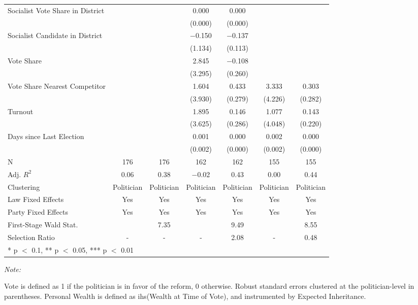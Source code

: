 \begin{table}[!h]
{\begin{threeparttable}
\begin{tabular}[t]{lcccccc}
Socialist Vote Share in District &  &  & \num{0.000} & \num{0.000} &  & \\
 &  &  & (\num{0.000}) & (\num{0.000}) &  & \\
Socialist Candidate in District &  &  & \num{-0.150} & \num{-0.137} &  & \\
 &  &  & (\num{1.134}) & (\num{0.113}) &  & \\
Vote Share &  &  & \num{2.845} & \num{-0.108} &  & \\
 &  &  & (\num{3.295}) & (\num{0.260}) &  & \\
Vote Share Nearest Competitor &  &  & \num{1.604} & \num{0.433} & \num{3.333} & \num{0.303}\\
 &  &  & (\num{3.930}) & (\num{0.279}) & (\num{4.226}) & (\num{0.282})\\
Turnout &  &  & \num{1.895} & \num{0.146} & \num{1.077} & \num{0.143}\\
 &  &  & (\num{3.625}) & (\num{0.286}) & (\num{4.048}) & (\num{0.220})\\
Days since Last Election &  &  & \num{0.001} & \num{0.000} & \num{0.002} & \num{0.000}\\
 &  &  & (\num{0.002}) & (\num{0.000}) & (\num{0.002}) & (\num{0.000})\\
\midrule
N & \num{176} & \num{176} & \num{162} & \num{162} & \num{155} & \num{155}\\
Adj. $R^2$ & \num{0.06} & \num{0.38} & \num{-0.02} & \num{0.43} & \num{0.00} & \num{0.44}\\
Clustering & Politician & Politician & Politician & Politician & Politician & Politician\\
Law Fixed Effects & Yes & Yes & Yes & Yes & Yes & Yes\\
Party Fixed Effects & Yes & Yes & Yes & Yes & Yes & Yes\\
First-Stage Wald Stat. &  & 7.35 &  & 9.49 &  & 8.55\\
Selection Ratio & - & - & - & 2.08 & - & 0.48\\
\bottomrule
\multicolumn{7}{l}{\rule{0pt}{1em}* p $<$ 0.1, ** p $<$ 0.05, *** p $<$ 0.01}\\
\end{tabular}
\begin{tablenotes}[para]
\item \textit{Note: } 
\item Vote is defined as 1 if the politician is in favor of the reform, 0 otherwise. Robust standard errors clustered at the politician-level in parentheses. Personal Wealth is defined as ihs(Wealth at Time of Vote), and instrumented by Expected Inheritance.
\end{tablenotes}
\end{threeparttable}}
\end{table}
